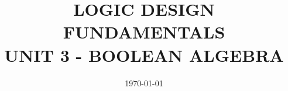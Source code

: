 \documentclass[a4paper,12pt]{article}
\title{\textbf{LOGIC DESIGN FUNDAMENTALS} \\ UNIT 3 - BOOLEAN ALGEBRA}
\date{\today}
\begin{document}
\raggedright
\maketitle





\end{document}
